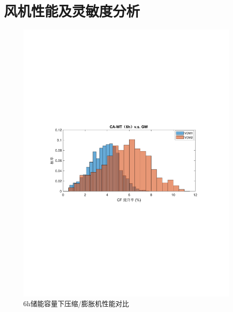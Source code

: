 \section{风机性能及灵敏度分析}
\begin{figure}[H] %
  \centering
  \includegraphics[scale=0.75]{figures/Chap5-CA-WT-6h-VS-GW-China.pdf}
  \caption{6h储能容量下压缩/膨胀机性能对比}
  \label{fig:CA-WT-6h-VS-GW-China}
\end{figure}


